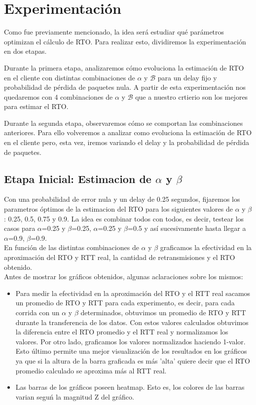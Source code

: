 \section{Experimentaci\'on}

Como fue previamente mencionado, la idea ser\'a estudiar qu\'e par\'ametros optimizan el c\'alculo de RTO. Para realizar esto, dividiremos la experimentaci\'on en dos etapas.

Durante la primera etapa, analizaremos c\'omo evoluciona la estimaci\'on de RTO en el cliente con distintas combinaciones de $\alpha$ y $\mathcal{B}$ para un delay fijo y probabilidad de p\'erdida de paquetes nula. A partir de esta experimentaci\'on nos quedaremos con 4 combinaciones de $\alpha$ y $\mathcal{B}$ que a nuestro crtierio son los mejores para estimar el RTO.

Durante la segunda etapa, observaremos c\'omo se comportan las combinaciones anteriores. Para ello volveremos a analizar como evoluciona la estimaci\'on de RTO en el cliente pero, esta vez, iremos variando el delay y la probabilidad de p\'erdida de paquetes. 

\subsection{Etapa Inicial: Estimacion de $\alpha$ y $\beta$}
Con una probabilidad de error nula y un delay de 0.25 segundos, fijaremos los parametros \'optimos de la estimacion del RTO para los siguientes valores de $\alpha$ y $\beta$: 0.25, 0.5, 0.75 y 0.9. La idea es combinar todos con todos, es decir, testear los casos para $\alpha$=0.25 y $\beta$=0.25, $\alpha$=0.25 y $\beta$=0.5 y as\'i sucesivamente hasta llegar a $\alpha$=0.9, $\beta$=0.9.\\

En funci\'on de las distintas combinaciones de $\alpha$ y $\beta$ graficamos la efectividad en la aproximaci\'on del RTO y RTT real, la cantidad de retransmisiones y el RTO obtenido.\\

Antes de mostrar los gr\'aficos obtenidos, algunas aclaraciones sobre los mismos:
\begin{itemize}
	\item Para medir la efectividad en la aproximaci\'on del RTO y el RTT real sacamos un promedio de RTO y RTT para cada experimento, es decir, para cada corrida con un $\alpha$ y $\beta$ determinados, obtuvimos un promedio de RTO y RTT durante la transferencia de los datos. Con estos valores calculados obtuvimos la diferencia entre el RTO promedio y el RTT real y normalizamos los valores. Por otro lado, graficamos los valores normalizados haciendo 1-valor. Esto \'ultimo permite una mejor visualizaci\'on de los resultados en los gr\'aficos ya que si la altura de la barra graficada es m\'as 'alta' quiere decir que el RTO promedio calculado se aproxima m\'as al RTT real. 
	\item Las barras de los gr\'aficos poseen heatmap. Esto es, los colores de las barras varian segu\'n la magnitud Z del gr\'afico.
\end{itemize}

